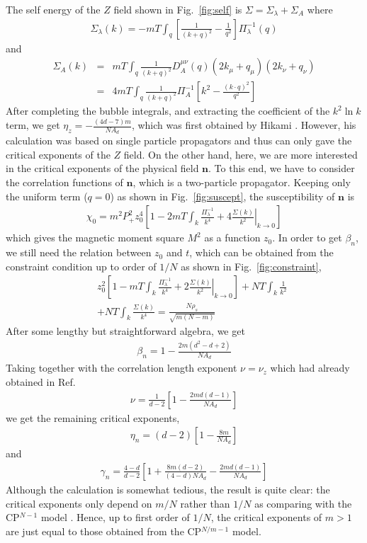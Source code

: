 \documentclass[aps,twocolumn,superscriptaddress]{revtex4-1}
\newcommand{\bea}{\begin{eqnarray}}
\newcommand{\eea}{\end{eqnarray}}
\newcommand{\bn}{\mathbf{n}}
\begin{document}
The self energy of the $Z$ field shown in Fig.~\ref{fig:self} is $\Sigma=\Sigma_\lambda+\Sigma_A$ where \bea
\Sigma_\lambda(k)=-mT\int_q \left[\frac{1}{(k+q)^2}-\frac{1}{q^2}\right]\Pi_\lambda^{-1}(q) \eea and \bea \Sigma_A(k)
&=& mT\int_q \frac{1}{(k+q)^2} D_A^{\mu\nu}(q) (2k_\mu+q_\mu) (2k_\nu+q_\nu) \nonumber \\&=& 4mT\int_q
\frac{1}{(k+q)^2}\Pi_A^{-1}\left[ k^2-\frac{(k\cdot q)^2}{q^2} \right] \eea After completing the bubble integrals, and
extracting the coefficient of the $k^2\ln k$ term, we get $\eta_z=-\frac{(4d-7)m}{NA_d}$, which was first obtained by
Hikami \cite{hikami1980}. However, his calculation was based on single particle propagators and thus can only gave the
critical exponents of the $Z$ field. On the other hand, here, we are more interested in the critical exponents of the
physical field $\bn$. To this end, we have to consider the correlation functions of $\bn$, which is a two-particle
propagator. Keeping only the uniform term ($q=0$) as shown in Fig.~\ref{fig:suscept}, the susceptibility of $\bn$ is
\bea \chi_0=m^2P_+^2 z_0^4\left[ 1-  2mT\int_k \frac{\Pi_\lambda^{-1}}{k^4} + 4
\left.\frac{\Sigma(k)}{k^2}\right|_{k\rightarrow0} \right] \eea which gives the magnetic moment square $M^2$ as a
function $z_0$. In order to get $\beta_n$, we still need the relation between $z_0$ and $t$, which can be obtained
from the constraint condition up to order of $1/N$ as shown in Fig.~\ref{fig:constraint}, \bea &&z_0^2 \left[ 1-
mT\int_k \frac{\Pi_\lambda^{-1}}{k^4} + 2 \left.\frac{\Sigma(k)}{k^2}\right|_{k\rightarrow0}\right] + NT\int_k
\frac{1}{k^2} \nonumber\\&&+ NT\int_k \frac{\Sigma(k)}{k^4} = \frac{N\rho_s}{\sqrt{m(N-m)}} \eea After some lengthy
but straightforward algebra, we get \bea \beta_n=1-\frac{2m(d^2-d+2)}{NA_d} \eea Taking together with the
correlation length exponent $\nu=\nu_z$ which had already obtained in Ref.~\cite{hikami1980} \bea
\nu=\frac{1}{d-2}\left[ 1-\frac{2md(d-1)}{NA_d} \right] \eea we get the remaining critical exponents, \bea
\eta_n=(d-2)\left[1-\frac{8m}{NA_d}\right] \eea and \bea \gamma_n=\frac{4-d}{d-2}\left[
1+\frac{8m(d-2)}{(4-d)NA_d}-\frac{2md(d-1)}{NA_d} \right] \eea Although the calculation is somewhat tedious, the
result is quite clear: the critical exponents only depend on $m/N$ rather than $1/N$ as comparing with the
CP$^{N-1}$ model \cite{irkhin1996}. Hence, up to first order of $1/N$, the critical exponents of $m>1$ are just
equal to those obtained from the CP$^{N/m-1}$ model. 
\end{document}
